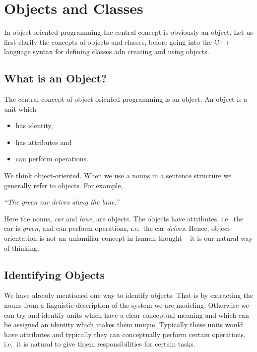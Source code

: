\section{Objects and Classes}

In object-oriented programming the central concept is obviously an object.
Let us first clarify the concepts of objects and classes, before going 
into the C++ language syntax for defining classes adn creating and using
objects.


\subsection{What is an Object?}

The central concept of object-oriented programming is an object. An object is
a unit which
\begin{itemize}
  \item has identity,
  \item has attributes and
  \item can perform operations.
\end{itemize}  

We think object-oriented. When we use a nouns in a sentence structure we
generally refer to objects. For example,

\centerline{\em ``The green car drives along the lane.''}

Here the nouns, {\em car} and {\em lane}, are objects. The objects have attributes, 
i.e.\ the car is {\em green}, and can perform operations, \i.e.\ the car {\em drives}.
Hence, object orientation is not an unfamiliar concept in human thought -- it is our
natural way of thinking.


\subsection{Identifying Objects}

We have already mentioned one way to identify objects. That is by extracting the nouns 
from a linguistic description of the system we are modeling. Otherwise we can try
and identify units which have a clear conceptual meaning and which can be assigned
an identity which makes them unique. Typically these units would have attributes
and typically they can conceptually perform certain operations, i.e.\ it is natural
to give thjem responsibilities for certain tasks.

